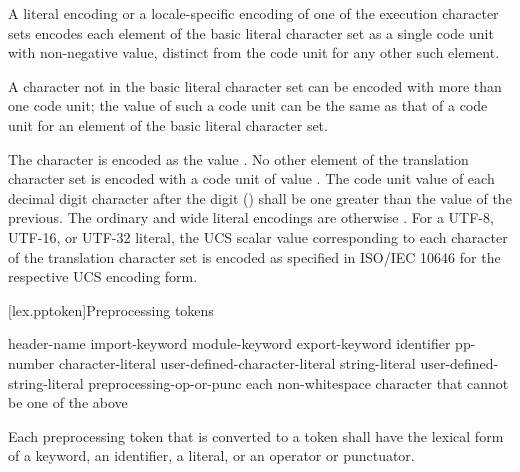 \pnum
A literal encoding or a locale-specific encoding of one of
the execution character sets
encodes each element of the basic literal character set as
a single code unit with non-negative value,
distinct from the code unit for any other such element.
\begin{note}
A character not in the basic literal character set
can be encoded with more than one code unit;
the value of such a code unit can be the same as
that of a code unit for an element of the basic literal character set.
\end{note}
%
%
The  character is encoded as the value .
No other element of the translation character set
is encoded with a code unit of value .
The code unit value of each decimal digit character after the digit  ()
shall be one greater than the value of the previous.
The ordinary and wide literal encodings are otherwise
.
%
%
%
For a UTF-8, UTF-16, or UTF-32 literal,
the UCS scalar value
corresponding to each character of the translation character set
is encoded as specified in ISO/IEC 10646 for the respective UCS encoding form.

[lex.pptoken]{Preprocessing tokens}

%
\begin{bnf}
\br
    header-name\br
    import-keyword\br
    module-keyword\br
    export-keyword\br
    identifier\br
    pp-number\br
    character-literal\br
    user-defined-character-literal\br
    string-literal\br
    user-defined-string-literal\br
    preprocessing-op-or-punc\br
    \textnormal{each non-whitespace character that cannot be one of the above}
\end{bnf}

\pnum
Each preprocessing token that is converted to a token
shall have the lexical form of a keyword, an identifier, a literal,
or an operator or punctuator.

